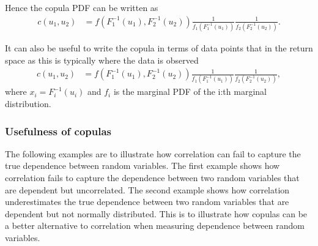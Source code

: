 Hence the copula \gls{PDF} can be written as 
\begin{align*}
    c(u_1,u_2) &= f(F_1^{-1}(u_1),F_2^{-1}(u_2)) \frac{1}{f_1(F_1^{-1}(u_1))}\frac{1}{f_2(F_2^{-1}(u_2))}. 
\end{align*}

It can also be useful to write the copula in terms of data points that in the return space as this is typically where the data is observed
\begin{align*}
    c(u_1,u_2) &= f(F_1^{-1}(u_1),F_2^{-1}(u_2)) \frac{1}{f_1(F_1^{-1}(u_1))}\frac{1}{f_2(F_2^{-1}(u_2))},
\end{align*}
where $x_i = F_i^{-1}(u_i)$ and $f_i$ is the marginal \gls{PDF} of the i:th marginal distribution. 



\subsubsection{Usefulness of copulas}

The following examples are to illustrate how correlation can fail to capture the true dependence between random variables. The first example shows how correlation fails to capture the dependence between two random variables that are dependent but uncorrelated. The second example shows how correlation underestimates the true dependence between two random variables that are dependent but not normally distributed. This is to illustrate how copulas can be a better alternative to correlation when measuring dependence between random variables.

